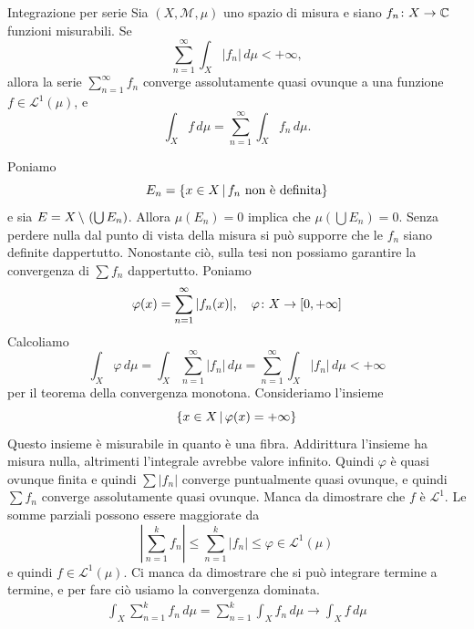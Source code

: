 \documentclass[a4paper]{article}
\begin{document}
\begin{radioactive}
\begin{snippettheorem}{Integrazione per serie}
    Sia \((X,\mathcal M,\mu)\) uno spazio di misura e siano
    \(f_n\colon X\to\mathbb{C}\) funzioni misurabili. Se
    \[
        \sum_{n=1}^{\infty}\int_X|f_n|\,d\mu<+\infty,
    \]
    allora la serie \(\sum_{n=1}^{\infty}f_n\) converge assolutamente quasi ovunque
    a una funzione \(f\in \mathcal L^1(\mu)\), e
    \[
        \int_Xf\,d\mu=\sum_{n=1}^{\infty}\int_Xf_n\,d\mu.
    \]
\end{snippettheorem}
\end{radioactive}

\begin{radioactive}
\begin{snippetproof}{}
    Poniamo \[
        E_n = \left\{
            x \in X \,|\, f_n \text{ non è definita}
        \right\}
    \]
    e sia \(E = X \,\backslash\, \left(\bigcup E_n\right)\).
    Allora \(\mu(E_n) = 0\) implica che \(\mu\left(\bigcup E_n\right) = 0\).
    Senza perdere nulla dal punto di vista della misura
    si può supporre che le \(f_n\) siano definite dappertutto.
    Nonostante ciò, sulla tesi non possiamo garantire la convergenza di \(\sum f_n\) dappertutto.
    Poniamo \[
        \varphi(x) = \sum_{n=1}^\infty |f_n(x)|, \quad \varphi \colon X \to [0,+\infty]
    \]
    Calcoliamo \[
        \int_X \varphi\,d\mu = \int_X \sum_{n=1}^\infty |f_n|\,d\mu
        = \sum_{n=1}^\infty \int_X |f_n| \,d\mu < +\infty
    \]
    per il teorema della convergenza monotona.
    Consideriamo l'insieme \[
        \left\{
            x \in X \,|\, \varphi(x) = +\infty
        \right\}
    \]
    Questo insieme è misurabile in quanto è una fibra. Addirittura l'insieme ha misura nulla, altrimenti
    l'integrale avrebbe valore infinito.
    Quindi \(\varphi\) è quasi ovunque finita e quindi \(\sum |f_n|\) converge puntualmente
    quasi ovunque, e quindi \(\sum f_n\) converge assolutamente quasi ovunque.
    Manca da dimostrare che \(f\) è \(\mathcal L^1\).
    Le somme parziali possono essere maggiorate da
    \[
        \left|\sum_{n=1}^k f_n\right|
        \leq \sum_{n=1}^k |f_n| \leq \varphi \in \mathcal L^1(\mu)
    \]
    e quindi \(f \in \mathcal L^1(\mu)\).
    Ci manca da dimostrare che si può integrare termine a termine, e per fare ciò usiamo la convergenza dominata.
    \begin{align*}
        \int_X \sum_{n=1}^k f_n \,d\mu = \sum_{n=1}^k \int_X f_n \,d\mu
        \to \int_X f\,d\mu
    \end{align*}
\end{snippetproof}
\end{radioactive}
\end{document}
